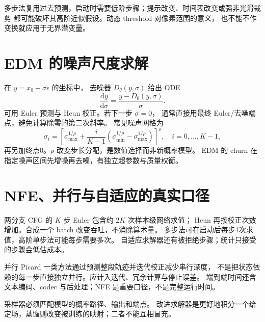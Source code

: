 多步法复用过去预测，启动时需要低阶步骤；提示改变、时间表改变或强非光滑裁剪
都可能破坏其高阶近似假设。动态 threshold 对像素范围的意义，
也不能不作变换就应用于无界潜变量。

\section{EDM 的噪声尺度求解}

在 $y=x_0+\sigma\epsilon$ 的坐标中，
去噪器 $D_\theta(y,\sigma)$ 给出 ODE
\begin{equation}\label{th:edm-ode}
\frac{\mathrm dy}{\mathrm d\sigma}=\frac{y-D_\theta(y,\sigma)}{\sigma}.
\end{equation}
可用 Euler 预测与 Heun 校正。若下一步 $\sigma=0$，
通常直接用最终 Euler/去噪端点，避免计算除零的第二次斜率。
常见噪声网格为
\[
\sigma_i=\left[\sigma_{\max}^{1/\rho}
 +\frac i{K-1}(\sigma_{\min}^{1/\rho}-\sigma_{\max}^{1/\rho})\right]^\rho,
\quad i=0,\ldots,K-1,
\]
再另加终点0。$\rho$ 改变步长分配，是数值选择而非新概率模型。
EDM 的 churn 在指定噪声区间先增噪再去噪，有独立超参数与质量权衡。

\section{NFE、并行与自适应的真实口径}

两分支 CFG 的 $K$ 步 Euler 包含约 $2K$ 次样本级网络求值；
Heun 再按校正次数增加。合成一个 batch 改变吞吐，不消除算术量。
多步法可在启动后每步1次求值，高阶单步法可能每步需要多次。
自适应求解器还有被拒绝步骤；统计只接受的步骤会低估成本。

并行 Picard 一类方法通过预测整段轨迹并迭代校正减少串行深度，
不是把状态依赖的每一步直接独立并行。应计入迭代、冗余计算与停止误差。
端到端时间还含文本编码、codec 与后处理；NFE 是重要口径，不是完整运行时间。

\begin{theorytakeaway}
采样器必须匹配模型的概率路径、输出和端点。
改进求解器是更好地积分一个给定场，蒸馏则改变被训练的映射；二者不能互相冒充。
\end{theorytakeaway}
